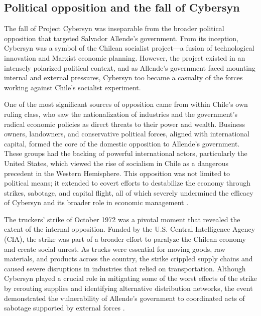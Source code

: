 \begin{refsection}
\subsection{Political opposition and the fall of Cybersyn}

The fall of Project Cybersyn was inseparable from the broader political opposition that targeted Salvador Allende's government. From its inception, Cybersyn was a symbol of the Chilean socialist project—a fusion of technological innovation and Marxist economic planning. However, the project existed in an intensely polarized political context, and as Allende's government faced mounting internal and external pressures, Cybersyn too became a casualty of the forces working against Chile’s socialist experiment.

One of the most significant sources of opposition came from within Chile’s own ruling class, who saw the nationalization of industries and the government’s radical economic policies as direct threats to their power and wealth. Business owners, landowners, and conservative political forces, aligned with international capital, formed the core of the domestic opposition to Allende’s government. These groups had the backing of powerful international actors, particularly the United States, which viewed the rise of socialism in Chile as a dangerous precedent in the Western Hemisphere. This opposition was not limited to political means; it extended to covert efforts to destabilize the economy through strikes, sabotage, and capital flight, all of which severely undermined the efficacy of Cybersyn and its broader role in economic management \cite[pp.~121-125]{kornbluh2016}.

The truckers' strike of October 1972 was a pivotal moment that revealed the extent of the internal opposition. Funded by the U.S. Central Intelligence Agency (CIA), the strike was part of a broader effort to paralyze the Chilean economy and create social unrest. As trucks were essential for moving goods, raw materials, and products across the country, the strike crippled supply chains and caused severe disruptions in industries that relied on transportation. Although Cybersyn played a crucial role in mitigating some of the worst effects of the strike by rerouting supplies and identifying alternative distribution networks, the event demonstrated the vulnerability of Allende’s government to coordinated acts of sabotage supported by external forces \cite[pp.~239-241]{harmer2011}. 


\end{refsection}
